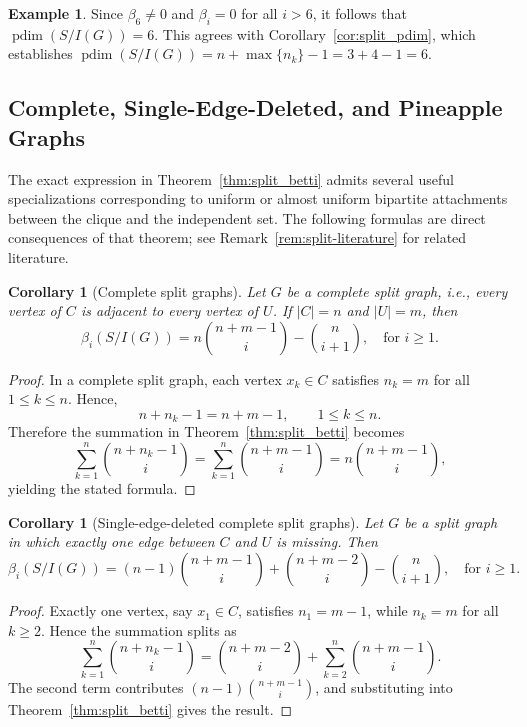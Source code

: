 \documentclass[12pt, reqno]{amsart}
\newtheorem{corollary}[theorem]{Corollary}
\theoremstyle{definition}
\newtheorem{example}[theorem]{Example}
\numberwithin{equation}{section}
\begin{document}
\begin{example}
		Since $\beta_6\neq 0$ and $\beta_i=0$ for all $i>6$, it follows that $\operatorname{pdim}(S/I(G))=6$. This agrees with Corollary~\ref{cor:split_pdim}, which establishes $\operatorname{pdim}(S/I(G)) = n + \max\{n_k\} - 1 = 3 + 4 - 1 = 6$.
	\end{example}
	
	\subsection{Complete, Single-Edge-Deleted, and Pineapple Graphs}
	
	The exact expression in Theorem~\ref{thm:split_betti} admits several useful specializations corresponding to uniform or almost uniform bipartite attachments between the clique and the independent set.  The following formulas are direct consequences of that theorem; see Remark~\ref{rem:split-literature} for related literature.
	
	\begin{corollary}[Complete split graphs]\label{cor:complete_split}
		Let $G$ be a complete split graph, i.e., every vertex of $C$ is adjacent to every vertex of $U$. If $|C|=n$ and $|U|=m$, then
		\[
		\beta_i(S/I(G)) = n\binom{n+m-1}{i} - \binom{n}{i+1}, \quad \text{for } i \ge1.
		\]
	\end{corollary}
	
	\begin{proof}
		In a complete split graph, each vertex $x_k \in C$ satisfies $n_k=m$ for all $1 \le k \le n$. Hence,
		\[
		n+n_k-1=n+m-1,\qquad 1\le k\le n.
		\]
		Therefore the summation in Theorem~\ref{thm:split_betti} becomes
		\[
		\sum_{k=1}^n \binom{n+n_k-1}{i} = \sum_{k=1}^n \binom{n+m-1}{i}
		= n\binom{n+m-1}{i},
		\]
		yielding the stated formula.
	\end{proof}
	
	\begin{corollary}[Single-edge-deleted complete split graphs]
		Let $G$ be a split graph in which exactly one edge between $C$ and $U$ is missing. Then
		\[
		\beta_i(S/I(G)) = (n-1)\binom{n+m-1}{i} + \binom{n+m-2}{i} - \binom{n}{i+1}, \quad \text{for } i \ge1.
		\]
	\end{corollary}
	
	\begin{proof}
		Exactly one vertex, say $x_1 \in C$, satisfies $n_1=m-1$, while $n_k=m$ for all $k\ge 2$. Hence the summation splits as
		\[
		\sum_{k=1}^n \binom{n+n_k-1}{i}
		= \binom{n+m-2}{i} + \sum_{k=2}^n \binom{n+m-1}{i}.
		\]
		The second term contributes $(n-1)\binom{n+m-1}{i}$, and substituting into Theorem~\ref{thm:split_betti} gives the result.
	\end{proof}
	
\end{document}
